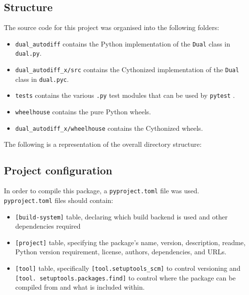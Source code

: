 \documentclass[11pt,a4paper]{article}
\begin{document}
\subsection{Structure}
The source code for this project was organised into the following folders:

\begin{itemize}
    \item \texttt{dual\_autodiff} contains the Python implementation of the \texttt{Dual} class in \texttt{dual.py}.
    \item \texttt{dual\_autodiff\_x/src} contains the Cythonized implementation of the \texttt{Dual} class in \texttt{dual.pyc}.
    \item \texttt{tests} contains the various \texttt{.py} test modules that can be used by \texttt{pytest} \citep{pytestx.y}.
    \item \texttt{wheelhouse} contains the pure Python wheels.
    \item \texttt{dual\_autodiff\_x/wheelhouse} contains the Cythonized wheels.
\end{itemize}
\newpage
The following is a representation of the overall directory structure:


\subsection{Project configuration}
In order to compile this package, a \texttt{pyproject.toml} file was used. \texttt{pyproject.toml} files should contain:
\begin{itemize}
    \item \texttt{[build-system]} table, declaring which build backend is used and other dependencies required
    \item \texttt{[project]} table, specifying the package's name, version, description, readme, Python version requirement, license, authors, dependencies, and URLs.
    \item \texttt{[tool]} table, specifically \texttt{[tool.setuptools\_scm]} to control versioning and \texttt{[tool. setuptools.packages.find]} to control where the package can be compiled from and what is included within.
\end{itemize}
% 
\end{document}
